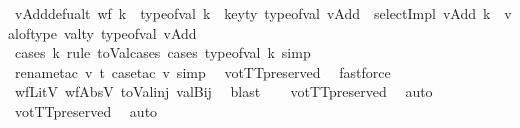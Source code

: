 \begin{isabellebody}
\endisatagproof
{\isafoldproof}%
%
\isadelimproof
\isanewline
%
\endisadelimproof
\isanewline
{}\isamarkupfalse%
\ vAdd{}defualt{\isacharcolon}{\kern0pt}\ {\isachardoublequoteopen}{\isacharparenleft}{\kern0pt}{\isasymnot}wf\ k\ {\isasymor}\ type{\isacharunderscore}{\kern0pt}of{\isacharunderscore}{\kern0pt}val\ k\ {\isasymnoteq}\ key{\isacharunderscore}{\kern0pt}ty\ {\isacharparenleft}{\kern0pt}type{\isacharunderscore}{\kern0pt}of{\isacharunderscore}{\kern0pt}val\ vAdd{}{\isacharparenright}{\kern0pt}{\isacharparenright}{\kern0pt}\ {\isasymLongrightarrow}\ {\isacharparenleft}{\kern0pt}selectImpl\ vAdd{}\ k{\isacharparenright}{\kern0pt}\ {\isacharequal}{\kern0pt}\ val{\isacharunderscore}{\kern0pt}of{\isacharunderscore}{\kern0pt}type\ {\isacharparenleft}{\kern0pt}val{\isacharunderscore}{\kern0pt}ty\ {\isacharparenleft}{\kern0pt}type{\isacharunderscore}{\kern0pt}of{\isacharunderscore}{\kern0pt}val\ vAdd{}{\isacharparenright}{\kern0pt}{\isacharparenright}{\kern0pt}{\isachardoublequoteclose}\isanewline
%
\isadelimproof
\ \ %
\endisadelimproof
%
\isatagproof
{}\isamarkupfalse%
\ {\isacharparenleft}{\kern0pt}cases\ {\isachardoublequoteopen}k{\isachardoublequoteclose}\ rule{\isacharcolon}{\kern0pt}\ toVal{}{}{}{}{\isachardot}{\kern0pt}cases{\isacharsemicolon}{\kern0pt}\ cases\ {\isachardoublequoteopen}type{\isacharunderscore}{\kern0pt}of{\isacharunderscore}{\kern0pt}val\ k{\isachardoublequoteclose}{\isacharsemicolon}{\kern0pt}\ simp{\isacharparenright}{\kern0pt}\ \isanewline
\ \ \ \ \ \ \isamarkupfalse%
\ {\isacharparenleft}{\kern0pt}rename{\isacharunderscore}{\kern0pt}tac\ v\ t{\isacharcomma}{\kern0pt}\ case{\isacharunderscore}{\kern0pt}tac\ v{\isacharsemicolon}{\kern0pt}\ simp{\isacharparenright}{\kern0pt}\ \isamarkupfalse%
\ votTTpreserved\ \isamarkupfalse%
\ fastforce\isanewline
\ \ \isamarkupfalse%
\ wfLitV\ wfAbsV\ toVal{}{}{}{}{\isacharunderscore}{\kern0pt}inj\ valBij\ \isamarkupfalse%
\ blast\isanewline
\ \ \isamarkupfalse%
\ votTTpreserved\ \isamarkupfalse%
\ auto{\isacharbrackleft}{\kern0pt}{}{\isacharbrackright}{\kern0pt}\isanewline
\ \ \isamarkupfalse%
\ votTTpreserved\ \isamarkupfalse%
\ auto{\isacharbrackleft}{\kern0pt}{}{\isacharbrackright}{\kern0pt}\isanewline

\end{isabellebody}
